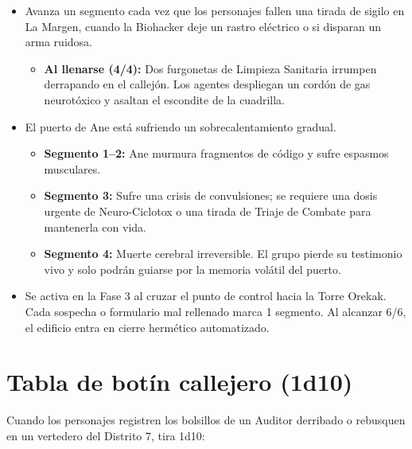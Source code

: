 \begin{itemize}
  \item {} Avanza un segmento cada vez que los personajes fallen una tirada de sigilo en La Margen, cuando la Biohacker deje un rastro eléctrico o si disparan un arma ruidosa.
    \begin{itemize}
      \item \textbf{Al llenarse (4/4):} Dos furgonetas de Limpieza Sanitaria irrumpen derrapando en el callejón. Los agentes despliegan un cordón de gas neurotóxico y asaltan el escondite de la cuadrilla.
    \end{itemize}
  \item {} El puerto de Ane está sufriendo un sobrecalentamiento gradual.
    \begin{itemize}
      \item \textbf{Segmento 1--2:} Ane murmura fragmentos de código y sufre espasmos musculares.
      \item \textbf{Segmento 3:} Sufre una crisis de convulsiones; se requiere una dosis urgente de Neuro-Ciclotox o una tirada de Triaje de Combate para mantenerla con vida.
      \item \textbf{Segmento 4:} Muerte cerebral irreversible. El grupo pierde su testimonio vivo y solo podrán guiarse por la memoria volátil del puerto.
    \end{itemize}
  \item {} Se activa en la Fase 3 al cruzar el punto de control hacia la Torre Orekak. Cada sospecha o formulario mal rellenado marca 1 segmento. Al alcanzar 6/6, el edificio entra en cierre hermético automatizado.
\end{itemize}

\section{Tabla de botín callejero (1d10)}

Cuando los personajes registren los bolsillos de un Auditor derribado o rebusquen en un vertedero del Distrito 7, tira 1d10:

